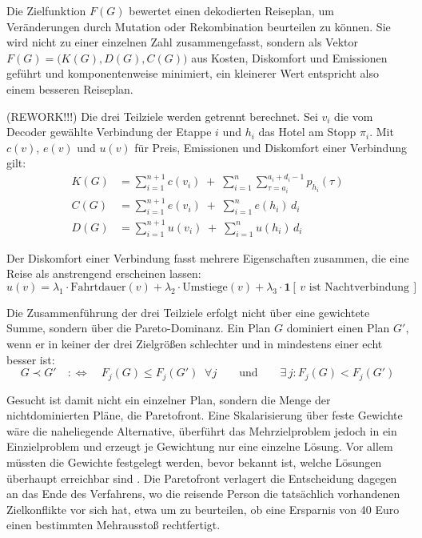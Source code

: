 Die Zielfunktion $F(G)$ bewertet einen dekodierten Reiseplan, um Veränderungen durch Mutation oder Rekombination beurteilen zu können. Sie wird nicht zu einer einzelnen Zahl zusammengefasst, sondern als Vektor $F(G) = \big(K(G), D(G), C(G)\big)$ aus Kosten, Diskomfort und Emissionen geführt und komponentenweise minimiert, ein kleinerer Wert entspricht also einem besseren Reiseplan.

(REWORK!!!) Die drei Teilziele werden getrennt berechnet. Sei $v_i$ die vom Decoder gewählte Verbindung der Etappe $i$ und $h_i$ das Hotel am Stopp $\pi_i$. Mit $c(v)$, $e(v)$ und $u(v)$ für Preis, Emissionen und Diskomfort einer Verbindung gilt:
\begin{align}
K(G) &= \sum_{i=1}^{n+1} c(v_i) \;+\; \sum_{i=1}^{n} \sum_{\tau = a_i}^{a_i + d_i - 1} p_{h_i}(\tau) \\
C(G) &= \sum_{i=1}^{n+1} e(v_i) \;+\; \sum_{i=1}^{n} e(h_i)\, d_i \\
D(G) &= \sum_{i=1}^{n+1} u(v_i) \;+\; \sum_{i=1}^{n} u(h_i)\, d_i
\end{align}

Der Diskomfort einer Verbindung fasst mehrere Eigenschaften zusammen, die eine Reise als anstrengend erscheinen lassen:
\begin{equation}
u(v) = \lambda_1 \cdot \text{Fahrtdauer}(v) + \lambda_2 \cdot \text{Umstiege}(v) + \lambda_3 \cdot \mathbf{1}[\,v \text{ ist Nachtverbindung}\,]
\end{equation}

Die Zusammenführung der drei Teilziele erfolgt nicht über eine gewichtete Summe, sondern über die Pareto-Dominanz. Ein Plan $G$ dominiert einen Plan $G'$, wenn er in keiner der drei Zielgrößen schlechter und in mindestens einer echt besser ist:
\begin{equation}
G \prec G' \quad :\Longleftrightarrow \quad F_j(G) \leq F_j(G') \;\; \forall j \qquad\text{und}\qquad \exists\, j: F_j(G) < F_j(G')
\end{equation}

Gesucht ist damit nicht ein einzelner Plan, sondern die Menge der nichtdominierten Pläne, die Paretofront. Eine Skalarisierung über feste Gewichte wäre die naheliegende Alternative, überführt das Mehrzielproblem jedoch in ein Einzielproblem und erzeugt je Gewichtung nur eine einzelne Lösung. Vor allem müssten die Gewichte festgelegt werden, bevor bekannt ist, welche Lösungen überhaupt erreichbar sind \cite[196]{eibenSmithIntroductionEvolutionary2015}. Die Paretofront verlagert die Entscheidung dagegen an das Ende des Verfahrens, wo die reisende Person die tatsächlich vorhandenen Zielkonflikte vor sich hat, etwa um zu beurteilen, ob eine Ersparnis von 40 Euro einen bestimmten Mehrausstoß rechtfertigt.

